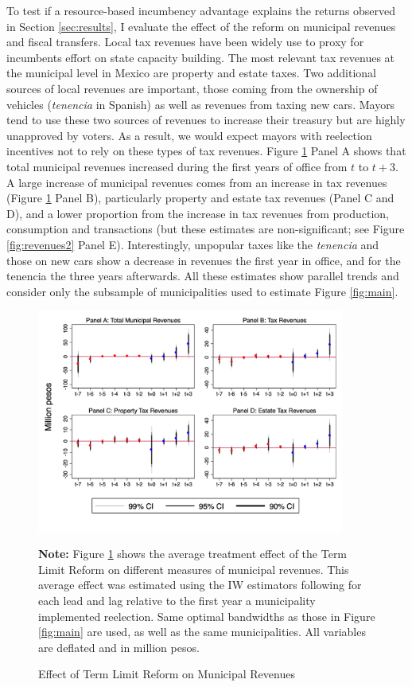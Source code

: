 \documentclass[12pt]{amsart}
\numberwithin{equation}{section}
\theoremstyle{definition}
\theoremstyle{definition}
\theoremstyle{definition}
\begin{document}
To test if a resource-based incumbency advantage explains the returns observed in Section \ref{sec:results}, I evaluate the effect of the reform on municipal revenues and fiscal transfers. Local tax revenues have been widely use to proxy for incumbents effort on state capacity building. The most relevant tax revenues at the municipal level in Mexico are property and estate taxes. Two additional sources of local revenues are important, those coming from the ownership of vehicles (\emph{tenencia} in Spanish) as well as revenues from taxing new cars. Mayors tend to use these two sources of revenues to increase their treasury but are highly unapproved by voters. As a result, we would expect mayors with reelection incentives not to rely on these types of tax revenues. Figure \ref{fig:revenues1} Panel A shows that total municipal revenues increased during the first years of office from $t$ to $t+3$. A large increase of municipal revenues comes from an increase in tax revenues (Figure \ref{fig:revenues1} Panel B), particularly property and estate tax revenues (Panel C and D), and a lower proportion from the increase in tax revenues from production, consumption and transactions (but these estimates are non-significant; see Figure \ref{fig:revenues2} Panel E). Interestingly, unpopular taxes like the \emph{tenencia} and those on new cars show a decrease in revenues the first year in office, and for the tenencia the three years afterwards. All these estimates show parallel trends and consider only the subsample of municipalities used to estimate Figure \ref{fig:main}. 
  
  
\begin{figure}[h]   
\centering
 \caption{Effect of Term Limit Reform on Municipal Revenues}
 \label{fig:revenues1}
\includegraphics[width=0.9\textwidth]{../Figures_incumbency/revenues_allyears1.png}
       \captionsetup{justification=centering}
         
 \textbf{Note:}  Figure \ref{fig:revenues1} shows the average treatment effect of the Term Limit Reform on different measures of municipal revenues. This average effect was estimated using the IW estimators following \citet{abraham_sun_2020} for each lead and lag relative to the first year a municipality implemented reelection. Same optimal bandwidths as those in Figure \ref{fig:main} are used, as well as the same municipalities. All variables are deflated and in million pesos. 
\end{figure}   
\end{document}
